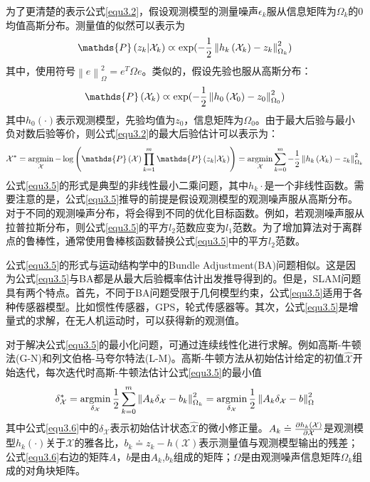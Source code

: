 为了更清楚的表示公式\eqref{equ3.2}，假设观测模型的测量噪声$\epsilon_k$服从信息矩阵为$\Omega_k$的0均值高斯分布。测量值的似然可以表示为
\begin{equation}
\label{equ3.3}
\mathds{P}\left(z_k \vert \mathcal{X}_k  \right) \varpropto \exp ( -{1 \over 2} \left\| h_k\left( \mathcal{X}_k \right) - z_k \right\|_{\Omega_k}^2 )
\end{equation}
其中，使用符号$\left\| e \right\|_{\Omega}^2 = e^T \Omega e$。类似的，假设先验也服从高斯分布：
\begin{equation}
\label{equ3.4}
\mathds{P}\left( \mathcal{X}_k  \right) \varpropto \exp ( -{1 \over 2} \left\| h_0\left( \mathcal{X}_0 \right) - z_0 \right\|_{\Omega_0}^2 )
\end{equation}
其中$h_0(\cdot)$表示观测模型，先验均值为$z_0$，信息矩阵为$\Omega_0$。由于最大后验与最小负对数后验等价，则公式\eqref{equ3.2}的最大后验估计可以表示为：
\begin{equation}
\label{equ3.5}
\mathcal{X}^* 
=
\argmin \limits_{\mathcal{X}} - \log \left( \mathds{P}\left(\mathcal{X}\right) \prod \limits_{k=1}^{m} \mathds{P}\left(z_k \vert \mathcal{X}_k  \right) \right)
=
\argmin \limits_{\mathcal{X}} \sum \limits_{k=0}^{m} -{1 \over 2} \left\| h_k\left( \mathcal{X}_k \right) - z_k \right\|_{\Omega_k}^2
\end{equation}
公式\eqref{equ3.5}的形式是典型的非线性最小二乘问题，其中$h_k{\cdot}$是一个非线性函数。需要注意的是，公式\eqref{equ3.5}推导的前提是假设观测模型的观测噪声服从高斯分布。对于不同的观测噪声分布，将会得到不同的优化目标函数。例如，若观测噪声服从拉普拉斯分布，则公式\eqref{equ3.5}的平方$l_2$范数应变为$l_1$范数。为了增加算法对于离群点的鲁棒性，通常使用鲁棒核函数\upcite{[3.4]}替换公式\eqref{equ3.5}中的平方$l_2$范数。

公式\eqref{equ3.5}的形式与运动结构学中的Bundle Adjustment(BA)问题相似。这是因为公式\eqref{equ3.5}与BA都是从最大后验概率估计出发推导得到的。但是，SLAM问题具有两个特点。首先，不同于BA问题受限于几何模型约束，公式\eqref{equ3.5}适用于各种传感器模型。比如惯性传感器，GPS，轮式传感器等。其次，公式\eqref{equ3.5}是增量式的求解，在无人机运动时，可以获得新的观测值。

对于解决公式\eqref{equ3.5}的最小化问题，可通过连续线性化进行求解。例如高斯-牛顿法(G-N)和列文伯格-马夸尔特法(L-M)。高斯-牛顿方法从初始估计给定的初值$\hat{\mathcal{X}}$开始迭代，每次迭代时高斯-牛顿法估计公式\eqref{equ3.5}的最小值
\begin{equation}
\label{equ3.6}
\delta_\mathcal{X}^* 
=
\operatorname*{argmin} \limits_{\delta_\mathcal{X}} {1 \over 2} \sum \limits_{k=0}^{m} \left\| A_k\delta_\mathcal{X}-b_k \right\|_{\Omega_k}^2
=
\operatorname*{argmin} \limits_{\delta_\mathcal{X}} {1 \over 2} \left\| A_k\delta_\mathcal{X}-b \right\|_{\Omega}^2
\end{equation}
其中公式\eqref{equ3.6}中的$\delta_\mathcal{X}$表示初始估计状态$\hat{\mathcal{X}}$的微小修正量。$A_k \doteq {\partial h_k(\mathcal{X}) \over \partial \mathcal{X}} $是观测模型$h_k(\cdot)$关于$\mathcal{X}$的雅各比，$b_k \doteq z_k-h(\mathcal{X})$表示测量值与观测模型输出的残差；公式\eqref{equ3.6}右边的矩阵$A$，$b$是由$A_k$,$b_k$组成的矩阵；$\Omega$是由观测噪声信息矩阵$\Omega_k$组成的对角块矩阵。

